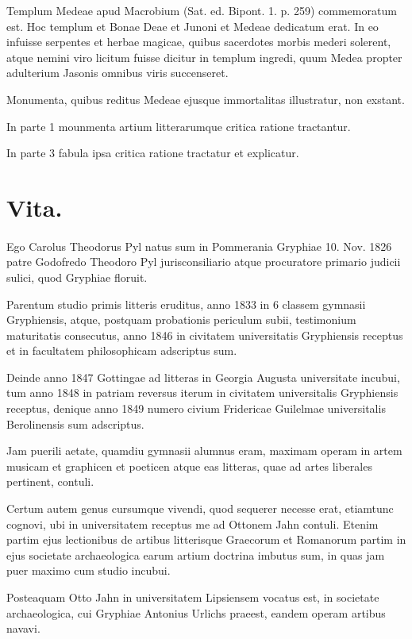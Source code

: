 \documentclass[a4paper, 11pt, oneside, polutonikogreek, german]{article}
\begin{document}
Templum Medeae apud Macrobium (Sat. ed. Bipont. 1. p. 259) commemoratum est. Hoc templum et Bonae Deae et Junoni et Medeae dedicatum erat. In eo infuisse serpentes et herbae magicae, quibus sacerdotes morbis mederi solerent, atque nemini viro licitum fuisse dicitur in templum ingredi, quum Medea propter adulterium Jasonis omnibus viris succenseret.

Monumenta, quibus reditus Medeae ejusque immortalitas illustratur, non exstant.

In parte 1 mounmenta artium litterarumque critica ratione tractantur.

In parte 3 fabula ipsa critica ratione tractatur et explicatur.
\clearpage
\section{Vita.}
\paragraph{}
Ego Carolus Theodorus Pyl natus sum in Pommerania Gryphiae 10. Nov. 1826 patre Godofredo Theodoro Pyl jurisconsiliario atque procuratore primario judicii sulici, quod Gryphiae floruit.

Parentum studio primis litteris eruditus, anno 1833 in 6 classem gymnasii Gryphiensis, atque, postquam probationis periculum subii, testimonium maturitatis consecutus, anno 1846 in civitatem universitatis Gryphiensis receptus et in facultatem philosophicam adscriptus sum.

Deinde anno 1847 Gottingae ad litteras in Georgia Augusta universitate incubui, tum anno 1848 in patriam reversus iterum in civitatem universitalis Gryphiensis receptus, denique anno 1849 numero civium Fridericae Guilelmae universitalis Berolinensis sum adscriptus.

Jam puerili aetate, quamdiu gymnasii alumnus eram, maximam operam in artem musicam et graphicen et poeticen atque eas litteras, quae ad artes liberales pertinent, contuli.

Certum autem genus cursumque vivendi, quod sequerer necesse erat, etiamtunc cognovi, ubi in universitatem receptus me ad Ottonem Jahn contuli. Etenim partim ejus lectionibus de artibus litterisque Graecorum et Romanorum partim in ejus societate archaeologica earum artium doctrina imbutus sum, in quas jam puer maximo cum studio incubui.

Posteaquam Otto Jahn in universitatem Lipsiensem vocatus est, in societate archaeologica, cui Gryphiae Antonius Urlichs praeest, eandem operam artibus navavi.
\end{document}
